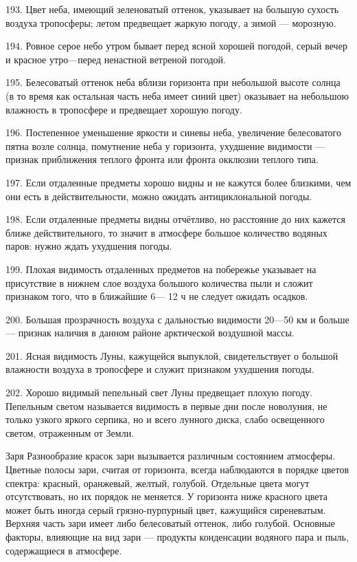193. Цвет неба, имеющий зеленоватый оттенок, указывает на большую сухость воздуха тропосферы; летом предвещает жаркую погоду, а зимой — морозную.

194. Ровное серое небо утром бывает перед ясной хорошей погодой, серый вечер и красное утро—перед ненастной ветреной погодой.

195. Белесоватый оттенок неба вблизи горизонта при небольшой высоте солнца (в то время как остальная часть неба имеет синий цвет) оказывает на небольшою влажность в тропосфере и предвещает хорошую погоду.

196. Постепенное уменьшение яркости и синевы неба, увеличение белесоватого пятна возле солнца, помутнение неба у горизонта, ухудшение видимости — признак приближения теплого фронта или фронта окклюзии теплого типа.

197. Если отдаленные предметы хорошо видны и не кажутся более близкими, чем они есть в действительности, можно ожидать антициклональной погоды.

198. Если отдаленные предметы видны отчётливо, но расстояние до них кажется ближе действительного, то значит в атмосфере большое количество водяных паров: нужно ждать ухудшения погоды.

199. Плохая видимость отдаленных предметов на побережье указывает на присутствие в нижнем слое воздуха большого количества пыли и сложит признаком того, что в ближайшие 6— 12 ч не следует ожидать осадков.

200. Большая прозрачность воздуха с дальностью видимости 20—50 км и больше — признак наличия в данном районе арктической воздушной массы.

201. Ясная видимость Луны, кажущейся выпуклой, свидетельствует о большой влажности воздуха в тропосфере и служит признаком ухудшения погоды.

202. Хорошо видимый пепельный свет Луны предвещает плохую погоду. Пепельным светом называется видимость в первые дни после новолуния, не только узкого яркого серпика, но и всего лунного диска, слабо освещенного светом, отраженным от Земли.

Заря
Разнообразие красок зари вызывается различным состоянием атмосферы. Цветные полосы зари, считая от горизонта, всегда наблюдаются в порядке цветов спектра: красный, оранжевый, желтый, голубой. Отдельные цвета могут отсутствовать, но их порядок не меняется. У горизонта ниже красного цвета может быть иногда серый грязно-пурпурный цвет, кажущийся сиреневатым. Верхняя часть зари имеет либо белесоватый оттенок, либо голубой. Основные факторы, влияющие на вид зари — продукты конденсации водяного пара и пыль, содержащиеся в атмосфере.

